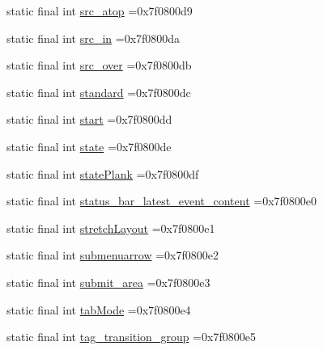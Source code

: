 \begin{DoxyCompactItemize}
\item 
static final int \mbox{\hyperlink{classcom_1_1example_1_1trainawearapplication_1_1_r_1_1id_a49b1ea653b90a320082243a3309f5e80}{src\+\_\+atop}} =0x7f0800d9
\item 
static final int \mbox{\hyperlink{classcom_1_1example_1_1trainawearapplication_1_1_r_1_1id_acc890227fe3475d4c321bf0b2cd38dce}{src\+\_\+in}} =0x7f0800da
\item 
static final int \mbox{\hyperlink{classcom_1_1example_1_1trainawearapplication_1_1_r_1_1id_ac67dee0c6f7e8de8186bec4a20acabe8}{src\+\_\+over}} =0x7f0800db
\item 
static final int \mbox{\hyperlink{classcom_1_1example_1_1trainawearapplication_1_1_r_1_1id_abc6901174f652afed6b06d09c6341367}{standard}} =0x7f0800dc
\item 
static final int \mbox{\hyperlink{classcom_1_1example_1_1trainawearapplication_1_1_r_1_1id_acb973a693fc2f894a7955f69945bf77d}{start}} =0x7f0800dd
\item 
static final int \mbox{\hyperlink{classcom_1_1example_1_1trainawearapplication_1_1_r_1_1id_a64ca1988077c36e0e866807309e48403}{state}} =0x7f0800de
\item 
static final int \mbox{\hyperlink{classcom_1_1example_1_1trainawearapplication_1_1_r_1_1id_a681c523be53529954b3eaec9b1a551ef}{state\+Plank}} =0x7f0800df
\item 
static final int \mbox{\hyperlink{classcom_1_1example_1_1trainawearapplication_1_1_r_1_1id_a918e3cd6364040312d0e03185c6c5ec3}{status\+\_\+bar\+\_\+latest\+\_\+event\+\_\+content}} =0x7f0800e0
\item 
static final int \mbox{\hyperlink{classcom_1_1example_1_1trainawearapplication_1_1_r_1_1id_acd5bbb0b7e7aeb9c4fa5bb396bca3b23}{stretch\+Layout}} =0x7f0800e1
\item 
static final int \mbox{\hyperlink{classcom_1_1example_1_1trainawearapplication_1_1_r_1_1id_af142c96a9a0cbb4e883fda4d170e53b5}{submenuarrow}} =0x7f0800e2
\item 
static final int \mbox{\hyperlink{classcom_1_1example_1_1trainawearapplication_1_1_r_1_1id_ad0af6105080312461c4a423a41433fec}{submit\+\_\+area}} =0x7f0800e3
\item 
static final int \mbox{\hyperlink{classcom_1_1example_1_1trainawearapplication_1_1_r_1_1id_a79eda6d8b96c389f35a0e942f07287a6}{tab\+Mode}} =0x7f0800e4
\item 
static final int \mbox{\hyperlink{classcom_1_1example_1_1trainawearapplication_1_1_r_1_1id_aee1bc5c781eaec5a8332808483e60c40}{tag\+\_\+transition\+\_\+group}} =0x7f0800e5

\end{DoxyCompactItemize}
